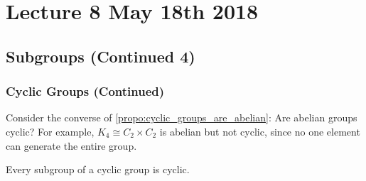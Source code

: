 \chapter{Lecture 8 May 18th 2018}%
\label{chp:lecture_8_may_18th_2018}

\section{Subgroups (Continued 4)}%
\label{sec:subgroups_continued_4}

\subsection{Cyclic Groups (Continued)}%
\label{sub:cyclic_groups_continued}

\begin{note}
  Consider the converse of \cref{propo:cyclic_groups_are_abelian}: Are abelian groups cyclic?  For example, $K_4 \cong C_2 \times C_2$ is abelian but not cyclic, since no one element can generate the entire group.
\end{note}

\begin{propo}
\label{propo:subgroups_of_cyclic_groups_are_cyclic}
  Every subgroup of a cyclic group is cyclic.
\end{propo}

